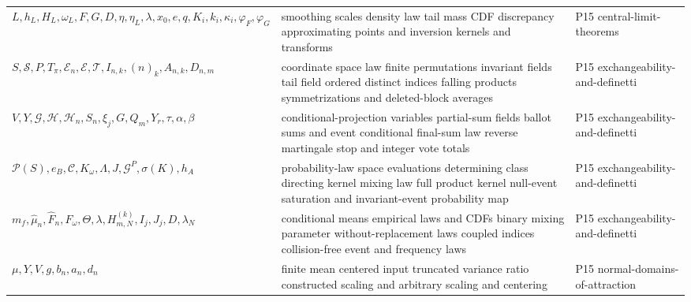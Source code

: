 \begin{longtable}{@{}p{}p{}p{}@{}}
\(L,\allowbreak h_L,\allowbreak H_L,\allowbreak \omega_L,\allowbreak F,\allowbreak G,\allowbreak D,\allowbreak \eta,\allowbreak \eta_L,\allowbreak \lambda,\allowbreak x_0,\allowbreak e,\allowbreak q,\allowbreak K_i,\allowbreak k_i,\allowbreak \kappa_i,\allowbreak \varphi_F,\allowbreak \varphi_G\) & smoothing scales density law tail mass CDF discrepancy approximating points and inversion kernels and transforms & P15 central-\allowbreak{}limit-\allowbreak{}theorems \\
\(S,\allowbreak \mathcal S,\allowbreak P,\allowbreak T_\pi,\allowbreak \mathcal E_n,\allowbreak \mathcal E,\allowbreak \mathcal T,\allowbreak I_{n,k},\allowbreak (n)_k,\allowbreak A_{n,k},\allowbreak D_{n,m}\) & coordinate space law finite permutations invariant fields tail field ordered distinct indices falling products symmetrizations and deleted-block averages & P15 exchangeability-\allowbreak{}and-\allowbreak{}definetti \\
\(V,\allowbreak Y,\allowbreak \mathcal G,\allowbreak \mathcal H,\allowbreak \mathcal H_n,\allowbreak S_n,\allowbreak \xi_j,\allowbreak G,\allowbreak Q_m,\allowbreak Y_r,\allowbreak \tau,\allowbreak \alpha,\allowbreak \beta\) & conditional-projection variables partial-sum fields ballot sums and event conditional final-sum law reverse martingale stop and integer vote totals & P15 exchangeability-\allowbreak{}and-\allowbreak{}definetti \\
\(\mathscr P(S),\allowbreak e_B,\allowbreak \mathcal C,\allowbreak K_\omega,\allowbreak \Lambda,\allowbreak J,\allowbreak \mathcal G^P,\allowbreak \sigma(K),\allowbreak h_A\) & probability-law space evaluations determining class directing kernel mixing law full product kernel null-event saturation and invariant-event probability map & P15 exchangeability-\allowbreak{}and-\allowbreak{}definetti \\
\(m_f,\allowbreak \widehat\mu_n,\allowbreak \widehat F_n,\allowbreak F_\omega,\allowbreak \Theta,\allowbreak \lambda,\allowbreak H_{m,N}^{(k)},\allowbreak I_j,\allowbreak J_j,\allowbreak D,\allowbreak \lambda_N\) & conditional means empirical laws and CDFs binary mixing parameter without-replacement laws coupled indices collision-free event and frequency laws & P15 exchangeability-\allowbreak{}and-\allowbreak{}definetti \\
\(\mu,\allowbreak Y,\allowbreak V,\allowbreak g,\allowbreak b_n,\allowbreak a_n,\allowbreak d_n\) & finite mean centered input truncated variance ratio constructed scaling and arbitrary scaling and centering & P15 normal-\allowbreak{}domains-\allowbreak{}of-\allowbreak{}attraction \\

\end{longtable}
